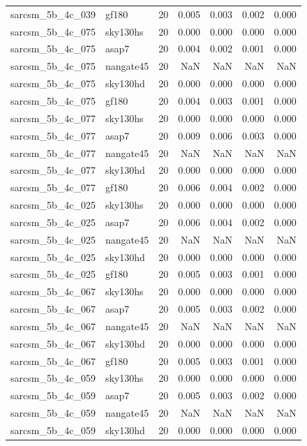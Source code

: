 \begin{tabular}{llrrrrr}
sarcsm\_5b\_4c\_039 & gf180 & 20 & 0.005 & 0.003 & 0.002 & 0.000 \\
sarcsm\_5b\_4c\_075 & sky130hs & 20 & 0.000 & 0.000 & 0.000 & 0.000 \\
sarcsm\_5b\_4c\_075 & asap7 & 20 & 0.004 & 0.002 & 0.001 & 0.000 \\
sarcsm\_5b\_4c\_075 & nangate45 & 20 & NaN & NaN & NaN & NaN \\
sarcsm\_5b\_4c\_075 & sky130hd & 20 & 0.000 & 0.000 & 0.000 & 0.000 \\
sarcsm\_5b\_4c\_075 & gf180 & 20 & 0.004 & 0.003 & 0.001 & 0.000 \\
sarcsm\_5b\_4c\_077 & sky130hs & 20 & 0.000 & 0.000 & 0.000 & 0.000 \\
sarcsm\_5b\_4c\_077 & asap7 & 20 & 0.009 & 0.006 & 0.003 & 0.000 \\
sarcsm\_5b\_4c\_077 & nangate45 & 20 & NaN & NaN & NaN & NaN \\
sarcsm\_5b\_4c\_077 & sky130hd & 20 & 0.000 & 0.000 & 0.000 & 0.000 \\
sarcsm\_5b\_4c\_077 & gf180 & 20 & 0.006 & 0.004 & 0.002 & 0.000 \\
sarcsm\_5b\_4c\_025 & sky130hs & 20 & 0.000 & 0.000 & 0.000 & 0.000 \\
sarcsm\_5b\_4c\_025 & asap7 & 20 & 0.006 & 0.004 & 0.002 & 0.000 \\
sarcsm\_5b\_4c\_025 & nangate45 & 20 & NaN & NaN & NaN & NaN \\
sarcsm\_5b\_4c\_025 & sky130hd & 20 & 0.000 & 0.000 & 0.000 & 0.000 \\
sarcsm\_5b\_4c\_025 & gf180 & 20 & 0.005 & 0.003 & 0.001 & 0.000 \\
sarcsm\_5b\_4c\_067 & sky130hs & 20 & 0.000 & 0.000 & 0.000 & 0.000 \\
sarcsm\_5b\_4c\_067 & asap7 & 20 & 0.005 & 0.003 & 0.002 & 0.000 \\
sarcsm\_5b\_4c\_067 & nangate45 & 20 & NaN & NaN & NaN & NaN \\
sarcsm\_5b\_4c\_067 & sky130hd & 20 & 0.000 & 0.000 & 0.000 & 0.000 \\
sarcsm\_5b\_4c\_067 & gf180 & 20 & 0.005 & 0.003 & 0.001 & 0.000 \\
sarcsm\_5b\_4c\_059 & sky130hs & 20 & 0.000 & 0.000 & 0.000 & 0.000 \\
sarcsm\_5b\_4c\_059 & asap7 & 20 & 0.005 & 0.003 & 0.002 & 0.000 \\
sarcsm\_5b\_4c\_059 & nangate45 & 20 & NaN & NaN & NaN & NaN \\
sarcsm\_5b\_4c\_059 & sky130hd & 20 & 0.000 & 0.000 & 0.000 & 0.000 \\

\end{tabular}
